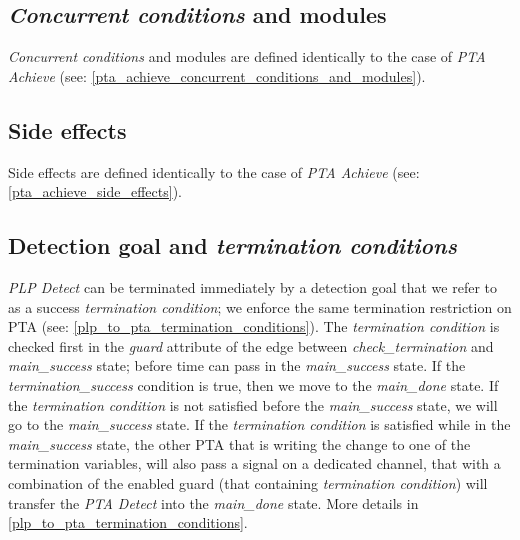 \subsection{\textit{Concurrent conditions} and modules}
\textit{Concurrent conditions} and modules are defined identically to the case of \textit{PTA Achieve} (see: \ref{pta_achieve_concurrent_conditions_and_modules}).\\
\subsection{Side effects}
Side effects are defined identically to the case of \textit{PTA Achieve} (see: \ref{pta_achieve_side_effects}). \\
\subsection{Detection goal and \textit{termination conditions} }
\textit{PLP Detect} can be terminated immediately by a detection goal that we refer to as a success \textit{termination condition}; we enforce the same termination restriction on PTA (see: \ref{plp_to_pta_termination_conditions}). The \textit{termination condition} is checked first in the \textit{guard} attribute of the edge between \textcolor{ColorUppaalState}{\textit{check_termination}} and \textcolor{ColorUppaalState}{\textit{main_success}} state; before time can pass in the \textcolor{ColorUppaalState}{\textit{main_success}} state. If the \textcolor{ColorEdgeGuard}{\textit{termination_success}} condition is true, then we move to the \textcolor{ColorUppaalState}{\textit{main_done}} state. If the \textit{termination condition} is not satisfied before the \textcolor{ColorUppaalState}{\textit{main_success}} state, we will go to the \textcolor{ColorUppaalState}{\textit{main_success}} state. If the \textit{termination condition} is satisfied while in the \textcolor{ColorUppaalState}{\textit{main_success}} state, the other PTA that is writing the change to one of the termination variables, will also pass a signal on a dedicated channel, that with a combination of the enabled guard (that containing \textit{termination condition}) will transfer the \textit{PTA Detect} into the \textcolor{ColorUppaalState}{\textit{main_done}} state. More details in \ref{plp_to_pta_termination_conditions}. \\
\clearpage
